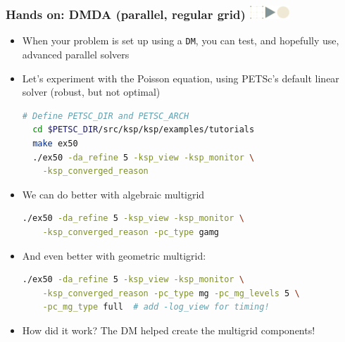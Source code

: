 \documentclass{beamer}
\newcommand\frametitlelogo[1]{\frametitle{#1\hspace{0pt plus 1 filll} \includegraphics[width=42pt]{logo_slides}}}
\begin{document}
\begin{frame}[fragile]
  \frametitlelogo{Hands on: DMDA (parallel, regular grid)}
  \begin{itemize}
    \item When your problem is set up using a \lstinline{DM}, you can test, and hopefully use, advanced parallel solvers
  \item Let's experiment with the Poisson equation, using PETSc's default linear solver (robust, but not optimal)
\begin{lstlisting}[language=bash,basicstyle=\scriptsize\ttfamily]
  # Define PETSC_DIR and PETSC_ARCH
  cd $PETSC_DIR/src/ksp/ksp/examples/tutorials
  make ex50
  ./ex50 -da_refine 5 -ksp_view -ksp_monitor \
    -ksp_converged_reason
  \end{lstlisting}
  \item We can do better with algebraic multigrid
\begin{lstlisting}[language=bash,basicstyle=\scriptsize\ttfamily]
  ./ex50 -da_refine 5 -ksp_view -ksp_monitor \
    -ksp_converged_reason -pc_type gamg
  \end{lstlisting}
  \item And even better with geometric multigrid:
\begin{lstlisting}[language=bash,basicstyle=\scriptsize\ttfamily]
  ./ex50 -da_refine 5 -ksp_view -ksp_monitor \
    -ksp_converged_reason -pc_type mg -pc_mg_levels 5 \
    -pc_mg_type full  # add -log_view for timing!
  \end{lstlisting}
  \item How did it work? The DM helped create the multigrid components!
  \end{itemize}
\end{frame}
\end{document}
